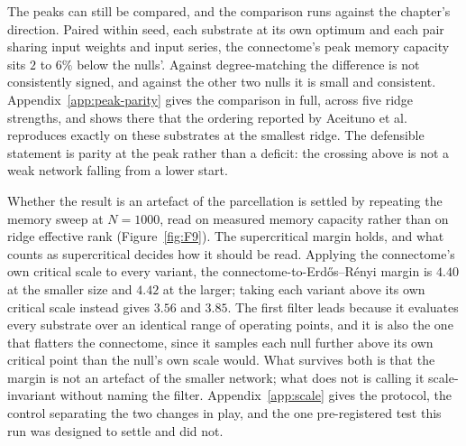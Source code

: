 The peaks can still be compared, and the comparison runs against the chapter's
direction. Paired within seed, each substrate at its own optimum and each pair
sharing input weights and input series, the connectome's peak memory capacity
sits
$2$ to $6\%$ %
below the nulls'. Against degree-matching the difference is not consistently
signed, and against the other two nulls it is small and consistent.
Appendix~\ref{app:peak-parity} gives the comparison in full, across five ridge
strengths, and shows there that the ordering reported by Aceituno et
al.~\cite{aceituno2020tailoring} reproduces exactly on these substrates at the
smallest ridge. The defensible statement is parity at the peak rather than a
deficit: the crossing above is not a weak network falling from a lower start.

Whether the result is an artefact of the parcellation is settled by repeating the
memory sweep at
$N = 1000$, %
read on measured memory capacity rather than on ridge effective rank
(Figure~\ref{fig:F9}). The supercritical margin holds, and what counts as
supercritical decides how it should be read. Applying the connectome's own
critical scale to every variant, the connectome-to-Erdős--Rényi margin is
$4.40$ at the smaller size and $4.42$ at the larger; %
taking each variant above its own critical scale instead gives
$3.56$ and $3.85$. %
The first filter leads because it evaluates every substrate over an identical
range of operating points, and it is also the one that flatters the
connectome, since it samples each null further above its own critical point than
the null's own scale would. What survives both is that the margin is not an
artefact of the smaller network; what does not is calling it scale-invariant
without naming the filter. Appendix~\ref{app:scale} gives the protocol, the
control separating the two changes in play, and the one pre-registered test this
run was designed to settle and did not.

